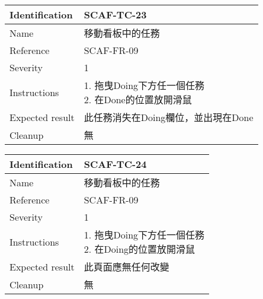 \documentclass{report}
\begin{document}
\begin{tabularx}{0.9\textwidth}{
  |p{}%
  |p{}|%
  }
  \hline
  \centering Identification &  SCAF-TC-23 \\
  \hline
  \centering Name & 移動看板中的任務 \\
  \hline
  \centering Reference & SCAF-FR-09 \\
  \hline
  \centering Severity & 1 \\
  \hline
  \centering Instructions & 
  \makecell{
    1. 拖曳Doing下方任一個任務  \\
    2. 在Done的位置放開滑鼠 
  }\\
  \hline
  \centering Expected result & 此任務消失在Doing欄位，並出現在Done \\
  \hline
  \centering Cleanup & 無 \\
  \hline
\end{tabularx}
\newline\newline

\begin{tabularx}{0.9\textwidth}{
  |p{}%
  |p{}|%
  }
  \hline
  \centering Identification &  SCAF-TC-24 \\
  \hline
  \centering Name & 移動看板中的任務 \\
  \hline
  \centering Reference & SCAF-FR-09 \\
  \hline
  \centering Severity & 1 \\
  \hline
  \centering Instructions & 
  \makecell{
    1. 拖曳Doing下方任一個任務  \\
    2. 在Doing的位置放開滑鼠  \\
  }\\
  \hline
  \centering Expected result & 此頁面應無任何改變 \\
  \hline
  \centering Cleanup & 無 \\
  \hline
\end{tabularx}
\newline\newline
\end{document}
